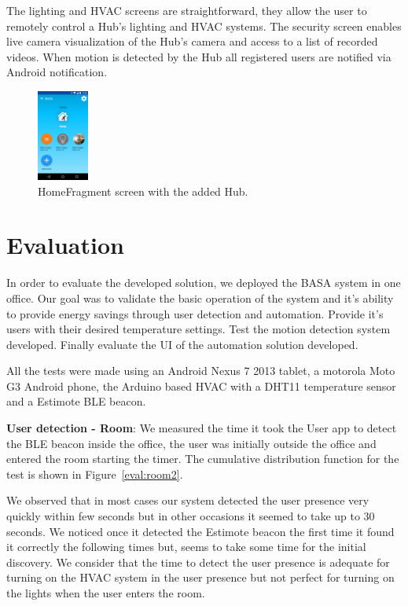 \documentclass[conference]{IEEEtran}
\begin{document}
The lighting and \ac{HVAC} screens are straightforward, they allow the user to remotely control a Hub's lighting and \ac{HVAC} systems. The security screen enables live camera visualization of the Hub's camera and access to a list of recorded videos. When motion is detected by the Hub all registered users are notified via Android notification. 


\begin{figure}[h]
\centering
\includegraphics[width=0.15\textwidth]{Figures/imp_home_user_app}
\caption{HomeFragment screen with the added Hub.}
\label{imp_user_app}
\end{figure}


\section{Evaluation}

In order to evaluate the developed solution, we deployed the BASA system in one office. Our goal was to validate the basic operation  of the system and it's ability to provide energy savings through user detection and automation. Provide it's users with their desired temperature settings. Test the motion detection system developed. Finally evaluate the \ac{UI} of the automation solution developed.

All the tests were made using an Android Nexus 7 2013 tablet, a motorola Moto G3 Android phone, the Arduino based HVAC with a DHT11 temperature sensor and a Estimote BLE beacon.

\textbf{User detection - Room}: We measured the time it took the User app to detect the BLE beacon inside the office, the user was initially outside the office and entered the room starting the timer. The cumulative distribution function for the test is shown in Figure~\ref{eval:room2}.

We observed that in most cases our system detected the user presence very quickly within few seconds but in other occasions it seemed to take up to 30 seconds. We noticed once it detected the Estimote beacon the first time it found it correctly the following times but, seems to take some time for the initial discovery. We consider that the time to detect the user presence is adequate for turning on the \ac{HVAC} system in the user presence but not perfect for turning on the lights when the user enters the room.
\end{document}
